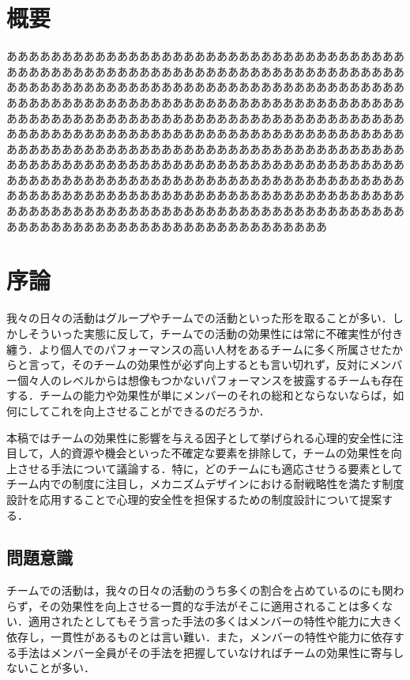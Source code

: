 \documentclass[a4paper, 11pt]{jsarticle}
\begin{document}
\maketitle

\hspace{0pt}
\vfill
\tableofcontents
\thispagestyle{empty}
\vfill
\hspace{0pt}
\newpage
\section*{概要}
あああああああああああああああああああああああああああああああああああああああああああああああああああああああああああああああああああああああああああああああああああああああああああああああああああああああああああああああああああああああああああああああああああああああああああああああああああああああああああああああああああああああああああああああああああああああああああああああああああああああああああああああああああああああああああああああああああああああああああああああああああああああああああああああああああああああああああああああああああああああああああああああああああああああああああああああああああああああああああああああああああああああああああああああああああああああああああああああああああああああああああああああああああああああああああああああああああああああああああああああああああああああああああああああああああああああああ
\section{序論}
我々の日々の活動はグループやチームでの活動といった形を取ることが多い．しかしそういった実態に反して，チームでの活動の効果性には常に不確実性が付き纏う．より個人でのパフォーマンスの高い人材をあるチームに多く所属させたからと言って，そのチームの効果性が必ず向上するとも言い切れず，反対にメンバー個々人のレベルからは想像もつかないパフォーマンスを披露するチームも存在する．チームの能力や効果性が単にメンバーのそれの総和とならないならば，如何にしてこれを向上させることができるのだろうか．

本稿ではチームの効果性に影響を与える因子として挙げられる心理的安全性に注目して，人的資源や機会といった不確定な要素を排除して，チームの効果性を向上させる手法について議論する．特に，どのチームにも適応させうる要素としてチーム内での制度に注目し，メカニズムデザインにおける耐戦略性を満たす制度設計を応用することで心理的安全性を担保するための制度設計について提案する．
\subsection{問題意識}
チームでの活動は，我々の日々の活動のうち多くの割合を占めているのにも関わらず，その効果性を向上させる一貫的な手法がそこに適用されることは多くない．適用されたとしてもそう言った手法の多くはメンバーの特性や能力に大きく依存し，一貫性があるものとは言い難い．また，メンバーの特性や能力に依存する手法はメンバー全員がその手法を把握していなければチームの効果性に寄与しないことが多い．
\end{document}
